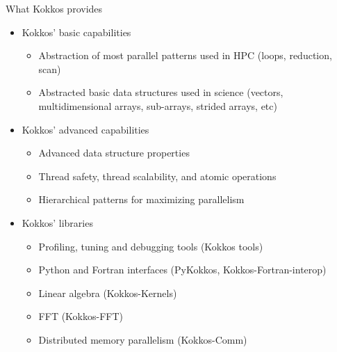 \begin{frame}{What Kokkos provides}
    \begin{itemize}
        \item Kokkos' basic capabilities
        \begin{itemize}
            \item Abstraction of most parallel patterns used in HPC (loops, reduction, scan)
            \item Abstracted basic data structures used in science (vectors, multidimensional arrays, sub-arrays, strided arrays, etc)
        \end{itemize}
        \pause
        \item Kokkos' advanced capabilities
        \begin{itemize}
            \item Advanced data structure properties
            \item Thread safety, thread scalability, and atomic operations
            \item Hierarchical patterns for maximizing parallelism
        \end{itemize}
        \pause
        \item Kokkos' libraries
        \begin{itemize}
            \item Profiling, tuning and debugging tools (Kokkos tools)
            \item Python and Fortran interfaces (PyKokkos, Kokkos-Fortran-interop)
            \item Linear algebra (Kokkos-Kernels)
            \item FFT (Kokkos-FFT)
            \item Distributed memory parallelism (Kokkos-Comm)
        \end{itemize}
    \end{itemize}
\end{frame}
